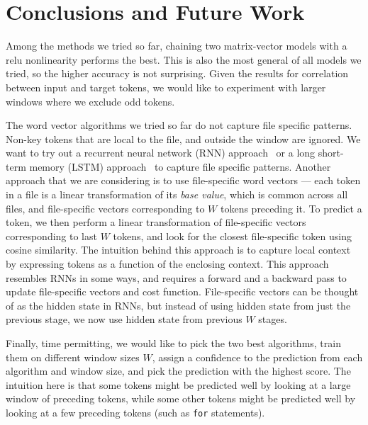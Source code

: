 \section{Conclusions and Future Work}
\label{sec:conclusions}

\noindent
Among the methods we tried so far, chaining two matrix-vector models with a
relu nonlinearity performs the best.
This is also the most general of all models we tried, so
the higher accuracy is not surprising. Given the results for correlation between
input and target tokens, we would like to experiment with larger windows
where we exclude odd tokens.

The word vector algorithms we tried so far do not capture file specific
patterns. Non-key tokens that are local to the file, and outside the window are
ignored. We want to try out a recurrent neural network (RNN)
approach~\cite{rnn} or a long short-term memory (LSTM) approach~\cite{lstm,
rnnlstm} to
capture file specific patterns. Another approach that we are considering is to
use file-specific word vectors --- each token in a file is a linear
transformation of its \emph{base value}, which is common across all files, and
file-specific vectors corresponding to $W$ tokens preceding it.
To predict a token, we then perform a linear transformation of file-specific
vectors corresponding to last $W$ tokens, and look for the closest
file-specific token using cosine similarity. The intuition behind this approach
is to capture local context by expressing tokens as a function of the enclosing
context. This approach resembles RNNs in some ways, and requires a forward and
a backward pass to update file-specific vectors and cost function.
File-specific vectors can be thought of as the hidden state in RNNs, but
instead of using hidden state from just the previous stage, we now use
hidden state from previous $W$ stages.

Finally, time permitting,
we would like to pick the two best algorithms, train them on different
window sizes $W$, assign a confidence to the prediction from each algorithm and
window size, and pick the prediction with the highest score.
The intuition here is that some tokens might be predicted well by
looking at a large window of preceding tokens, while some other tokens might
be predicted well by looking at a few preceding tokens (such as {\tt for}
statements).
